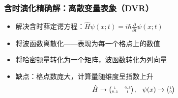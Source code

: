 \documentclass{beamer}
\begin{document}
\begin{frame}[t]\frametitle{含时演化精确解：离散变量表象（DVR）}
\begin{itemize}
	\item 解决含时薛定谔方程：$\hat{H} \psi(x;t) = i \hbar \frac{\partial}{\partial t} \psi(x;t)$
	\item 将波函数离散化——表现为每一个格点上的数值
	\item 将哈密顿量转化为一个矩阵，波函数转化为列向量
	\item 缺点：格点数庞大，计算量随维度呈指数上升
	\begin{equation*}
	\tiny
	\hat{H} \rightarrow
	\begin{pmatrix}
	1 & 0.5 \\
	0.5 & 1
	\end{pmatrix}
	, \quad
	\psi(x) \rightarrow
	\begin{pmatrix}
	1 \\
	0
	\end{pmatrix}
	\end{equation*}
\end{itemize}


\begin{figure}
\centering
{}
\end{figure}
\end{frame}
\end{document}
